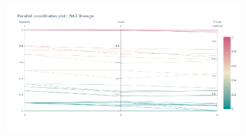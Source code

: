         \begin{figure}[htbp]
        	\centering
            \includegraphics[width=0.8\textwidth]{figures/further/pc-ba2-all.png}
            \label{fig:further:parallel-ba2-all}
        \end{figure}
        
